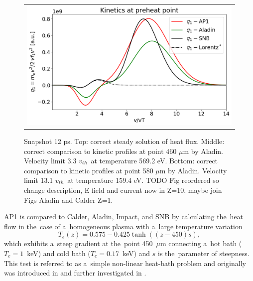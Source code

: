 \begin{figure}[htb]
\begin{center}
\begin{tabular}{c}
      \includegraphics[width=\figscale\textwidth]{../VFPdata/C7_Aladin_case3_nonlocal_kinetics.png}  
    \end{tabular}
  \caption{  
  Snapshot 12 ps. Top: correct steady solution of heat flux.  
  Middle: correct comparison to kinetic profiles at point 460 $\mu$m by Aladin. 
  Velocity limit 3.3 $v_{th}$ at temperature 569.2 eV.
  Bottom: correct comparison to kinetic profiles at point 580 $\mu$m by Aladin.
  Velocity limit 13.1 $v_{th}$ at temperature 159.4 eV.
  TODO Fig reordered so change description, E field and current now in Z=10, maybe join Figs Aladin and Calder Z=1. 
  }
  \label{fig:C7_Aladin_case3}
  \end{center} 
\end{figure}

AP1 is compared to Calder, Aladin, Impact, and SNB by 
calculating the~heat flow in the~case of a~homogeneous plasma
with a~large temperature variation
\begin{equation}
  T_e(z) = 0.575 - 0.425 \tanh\left((z-450) s\right) ,
  \label{eq:T_init}
\end{equation}
which exhibits a~steep gradient at the~point 450~$\mu$m 
connecting a~hot bath ($T_e = 1$~keV) 
and cold bath ($T_e = 0.17$~keV) and $s$ is the~parameter of steepness. 
This test is referred to as a~simple non-linear heat-bath problem and
originally was introduced in \cite{marocchino2013} and further investigated
in  \cite{Sorbo_2015, Sorbo_2016, Sherlock_PoP2017, Brodrick_PoP2017}.


